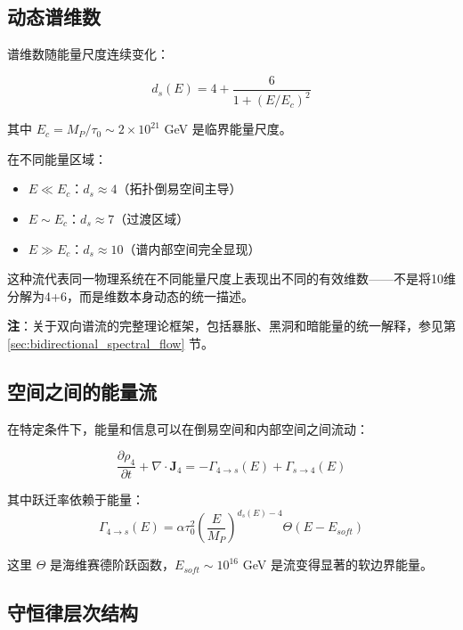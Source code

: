 \subsection{动态谱维数}

谱维数随能量尺度连续变化：

\begin{equation}
    d_s(E) = 4 + \frac{6}{1 + (E/E_c)^2}
\end{equation}

其中 $E_c = M_P / \tau_0 \sim 2 \times 10^{21}$ GeV 是临界能量尺度。

在不同能量区域：
\begin{itemize}
    \item $E \ll E_c$：$d_s \approx 4$（拓扑倒易空间主导）
    \item $E \sim E_c$：$d_s \approx 7$（过渡区域）
    \item $E \gg E_c$：$d_s \approx 10$（谱内部空间完全显现）
\end{itemize}

这种流代表同一物理系统在不同能量尺度上表现出不同的有效维数——不是将10维分解为4+6，而是维数本身动态的统一描述。

\textbf{注}：关于双向谱流的完整理论框架，包括暴胀、黑洞和暗能量的统一解释，参见第 \ref{sec:bidirectional_spectral_flow} 节。

\subsection{空间之间的能量流}

在特定条件下，能量和信息可以在倒易空间和内部空间之间流动：

\begin{equation}
    \frac{\partial \rho_4}{\partial t} + \nabla \cdot \mathbf{J}_4 = -\Gamma_{4 \to s}(E) + \Gamma_{s \to 4}(E)
\end{equation}

其中跃迁率依赖于能量：
\begin{equation}
    \Gamma_{4 \to s}(E) = \alpha \tau_0^2 \left(\frac{E}{M_P}\right)^{d_s(E) - 4} \Theta(E - E_{soft})
\end{equation}

这里 $\Theta$ 是海维赛德阶跃函数，$E_{soft} \sim 10^{16}$ GeV 是流变得显著的软边界能量。

\subsection{守恒律层次结构}


